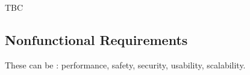       \begin{content}
          TBC
        \end{content}

  \subsection{Nonfunctional Requirements}


    \begin{content}
        These can be : performance, safety, security, usability, scalability.
      \end{content}

\newpage
